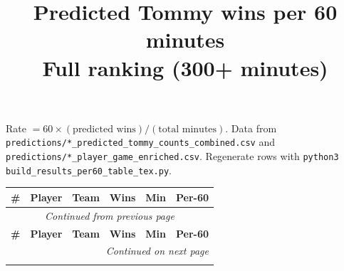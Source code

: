 \documentclass[11pt]{article}
\title{Predicted Tommy wins per 60 minutes\\{\large Full ranking (300+ minutes)}}
\author{}
\date{}
\begin{document}
\maketitle

\noindent
Rate $= 60 \times (\text{predicted wins}) / (\text{total minutes})$.
Data from \texttt{predictions/*\_predicted\_tommy\_counts\_combined.csv} and
\texttt{predictions/*\_player\_game\_enriched.csv}. Regenerate rows with
\texttt{python3 build\_results\_per60\_table\_tex.py}.

\vspace{1em}

\footnotesize
\setlength{\tabcolsep}{4pt}
\begin{longtable}{@{}r l l r r r@{}}
    \toprule
    \textbf{\#} & \textbf{Player} & \textbf{Team} & \textbf{Wins} & \textbf{Min} & \textbf{Per-60} \\
    \endfirsthead
    \multicolumn{6}{c}{\textit{Continued from previous page}} \\
    \toprule
    \textbf{\#} & \textbf{Player} & \textbf{Team} & \textbf{Wins} & \textbf{Min} & \textbf{Per-60} \\
    \endhead
    \midrule
    \multicolumn{6}{r}{\textit{Continued on next page}} \\
    \endfoot
    \bottomrule
    \endlastfoot
    
\end{longtable}
\end{document}
